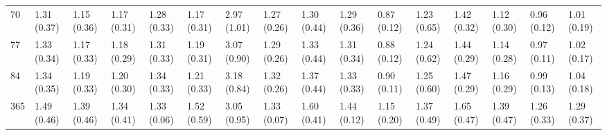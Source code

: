 \begin{tabular}{llllllllllllllll}
70  &  1.31 (0.37) &  1.15 (0.36) &  1.17 (0.31) &  1.28 (0.33) &  1.17 (0.31) &  2.97 (1.01) &  1.27 (0.26) &  1.30 (0.44) &  1.29 (0.36) &  0.87 (0.12) &  1.23 (0.65) &  1.42 (0.32) &  1.12 (0.30) &  0.96 (0.12) &  1.01 (0.19) \\
77  &  1.33 (0.34) &  1.17 (0.33) &  1.18 (0.29) &  1.31 (0.33) &  1.19 (0.31) &  3.07 (0.90) &  1.29 (0.26) &  1.33 (0.44) &  1.31 (0.34) &  0.88 (0.12) &  1.24 (0.62) &  1.44 (0.29) &  1.14 (0.28) &  0.97 (0.11) &  1.02 (0.17) \\
84  &  1.34 (0.35) &  1.19 (0.33) &  1.20 (0.30) &  1.34 (0.33) &  1.21 (0.33) &  3.18 (0.84) &  1.32 (0.26) &  1.37 (0.44) &  1.33 (0.33) &  0.90 (0.11) &  1.25 (0.60) &  1.47 (0.29) &  1.16 (0.29) &  0.99 (0.13) &  1.04 (0.18) \\
365 &  1.49 (0.46) &  1.39 (0.46) &  1.34 (0.41) &  1.33 (0.06) &  1.52 (0.59) &  3.05 (0.95) &  1.33 (0.07) &  1.60 (0.41) &  1.44 (0.12) &  1.15 (0.20) &  1.37 (0.49) &  1.65 (0.47) &  1.39 (0.47) &  1.26 (0.33) &  1.29 (0.37) \\
\bottomrule
\end{tabular}
